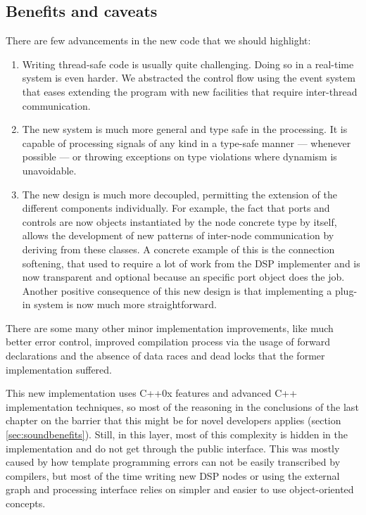 \subsection{Benefits and caveats}

There are few advancements in the new code that we should highlight:
\begin{enumerate}
\item Writing thread-safe code is usually quite challenging. Doing so
  in a real-time system is even harder. We abstracted the control flow
  using the event system that eases extending the program with new
  facilities that require inter-thread communication.

\item The new system is much more general and type safe in the
  processing. It is capable of processing signals of any kind in a
  type-safe manner --- whenever possible --- or throwing exceptions on
  type violations where dynamism is unavoidable.

\item The new design is much more decoupled, permitting the extension
  of the different components individually. For example, the fact that
  ports and controls are now objects instantiated by the node concrete
  type by itself, allows the development of new patterns of inter-node
  communication by deriving from these classes. A concrete example of
  this is the connection softening, that used to require a lot of work
  from the DSP implementer and is now transparent and optional because
  an specific port object does the job. Another positive consequence
  of this new design is that implementing a plug-in system is now much
  more straightforward.
\end{enumerate}

There are some many other minor implementation improvements, like much
better error control, improved compilation process via the usage of
forward declarations and the absence of data races and dead locks that
the former implementation suffered.

This new implementation uses C++0x features and advanced C++
implementation techniques, so most of the reasoning in the conclusions
of the last chapter on the barrier that this might be for novel
developers applies (section \ref{sec:soundbenefits}). Still, in this
layer, most of this complexity is hidden in the implementation and do
not get through the public interface. This was mostly caused by how
template programming errors can not be easily transcribed by
compilers, but most of the time writing new DSP nodes or using the
external graph and processing interface relies on simpler
and easier to use object-oriented concepts.

